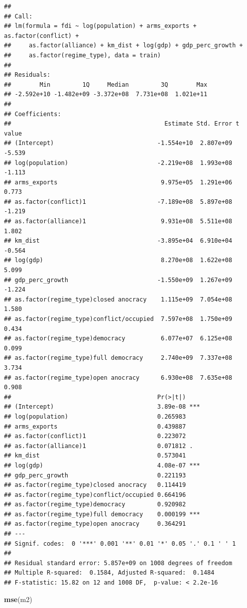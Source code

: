\documentclass[11pt,]{article}
\newenvironment{Shaded}{\begin{snugshade}}{\end{snugshade}}
\newcommand{\KeywordTok}[1]{\textcolor[rgb]{0.13,0.29,0.53}{\textbf{#1}}}
\newcommand{\NormalTok}[1]{#1}
\begin{document}
\begin{verbatim}
## 
## Call:
## lm(formula = fdi ~ log(population) + arms_exports + as.factor(conflict) + 
##     as.factor(alliance) + km_dist + log(gdp) + gdp_perc_growth + 
##     as.factor(regime_type), data = train)
## 
## Residuals:
##        Min         1Q     Median         3Q        Max 
## -2.592e+10 -1.482e+09 -3.372e+08  7.731e+08  1.021e+11 
## 
## Coefficients:
##                                           Estimate Std. Error t value
## (Intercept)                             -1.554e+10  2.807e+09  -5.539
## log(population)                         -2.219e+08  1.993e+08  -1.113
## arms_exports                             9.975e+05  1.291e+06   0.773
## as.factor(conflict)1                    -7.189e+08  5.897e+08  -1.219
## as.factor(alliance)1                     9.931e+08  5.511e+08   1.802
## km_dist                                 -3.895e+04  6.910e+04  -0.564
## log(gdp)                                 8.270e+08  1.622e+08   5.099
## gdp_perc_growth                         -1.550e+09  1.267e+09  -1.224
## as.factor(regime_type)closed anocracy    1.115e+09  7.054e+08   1.580
## as.factor(regime_type)conflict/occupied  7.597e+08  1.750e+09   0.434
## as.factor(regime_type)democracy          6.077e+07  6.125e+08   0.099
## as.factor(regime_type)full democracy     2.740e+09  7.337e+08   3.734
## as.factor(regime_type)open anocracy      6.930e+08  7.635e+08   0.908
##                                         Pr(>|t|)    
## (Intercept)                             3.89e-08 ***
## log(population)                         0.265983    
## arms_exports                            0.439887    
## as.factor(conflict)1                    0.223072    
## as.factor(alliance)1                    0.071812 .  
## km_dist                                 0.573041    
## log(gdp)                                4.08e-07 ***
## gdp_perc_growth                         0.221193    
## as.factor(regime_type)closed anocracy   0.114419    
## as.factor(regime_type)conflict/occupied 0.664196    
## as.factor(regime_type)democracy         0.920982    
## as.factor(regime_type)full democracy    0.000199 ***
## as.factor(regime_type)open anocracy     0.364291    
## ---
## Signif. codes:  0 '***' 0.001 '**' 0.01 '*' 0.05 '.' 0.1 ' ' 1
## 
## Residual standard error: 5.857e+09 on 1008 degrees of freedom
## Multiple R-squared:  0.1584, Adjusted R-squared:  0.1484 
## F-statistic: 15.82 on 12 and 1008 DF,  p-value: < 2.2e-16
\end{verbatim}

\begin{Shaded}
\begin{Highlighting}[]
\KeywordTok{mse}\NormalTok{(m2)}
\end{Highlighting}
\end{Shaded}
\end{document}
